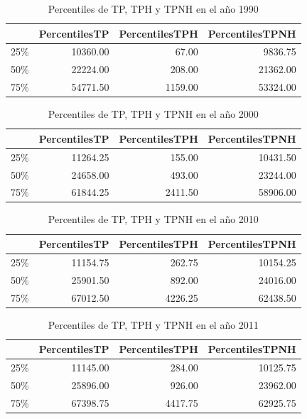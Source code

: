 \documentclass[conference]{IEEEtran}\usepackage[]{graphicx}\usepackage[]{color}
\begin{document}
\begin{table}[ht]
\centering
\begin{tabular}{rrrr}
  \hline
 & PercentilesTP & PercentilesTPH & PercentilesTPNH \\ 
  \hline
25\% & 10360.00 & 67.00 & 9836.75 \\ 
  50\% & 22224.00 & 208.00 & 21362.00 \\ 
  75\% & 54771.50 & 1159.00 & 53324.00 \\ 
   \hline
\end{tabular}
\caption{Percentiles de TP, TPH y TPNH en el año 1990} 
\end{table}


\begin{table}[ht]
\centering
\begin{tabular}{rrrr}
  \hline
 & PercentilesTP & PercentilesTPH & PercentilesTPNH \\ 
  \hline
25\% & 11264.25 & 155.00 & 10431.50 \\ 
  50\% & 24658.00 & 493.00 & 23244.00 \\ 
  75\% & 61844.25 & 2411.50 & 58906.00 \\ 
   \hline
\end{tabular}
\caption{Percentiles de TP, TPH y TPNH en el año 2000} 
\end{table}

	
\begin{table}[ht]
\centering
\begin{tabular}{rrrr}
  \hline
 & PercentilesTP & PercentilesTPH & PercentilesTPNH \\ 
  \hline
25\% & 11154.75 & 262.75 & 10154.25 \\ 
  50\% & 25901.50 & 892.00 & 24016.00 \\ 
  75\% & 67012.50 & 4226.25 & 62438.50 \\ 
   \hline
\end{tabular}
\caption{Percentiles de TP, TPH y TPNH en el año 2010} 
\end{table}

	
\begin{table}[ht]
\centering
\begin{tabular}{rrrr}
  \hline
 & PercentilesTP & PercentilesTPH & PercentilesTPNH \\ 
  \hline
25\% & 11145.00 & 284.00 & 10125.75 \\ 
  50\% & 25896.00 & 926.00 & 23962.00 \\ 
  75\% & 67398.75 & 4417.75 & 62925.75 \\ 
   \hline
\end{tabular}
\caption{Percentiles de TP, TPH y TPNH en el año 2011} 
\end{table}
\end{document}
